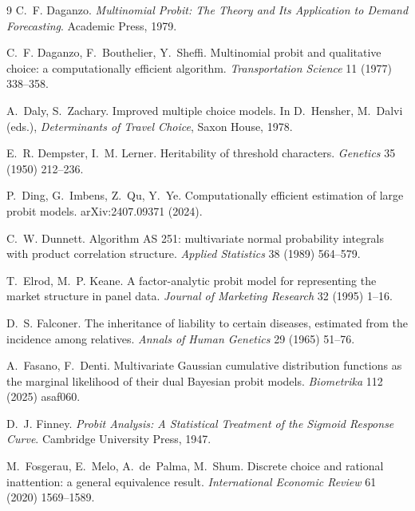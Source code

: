 \documentclass[12pt]{article}
\theoremstyle{remark}
\begin{document}
\begin{thebibliography}{9}
 C.~F. Daganzo. \emph{Multinomial
Probit: The Theory and Its Application to Demand Forecasting}. Academic
Press, 1979.

 C.~F. Daganzo, F.~Bouthelier, Y.~Sheffi.
Multinomial probit and qualitative choice: a computationally efficient
algorithm. \emph{Transportation Science} 11 (1977) 338--358.

 A.~Daly, S.~Zachary.
Improved multiple choice models. In D.~Hensher, M.~Dalvi (eds.),
\emph{Determinants of Travel Choice}, Saxon House, 1978.

 E.~R. Dempster,
I.~M. Lerner. Heritability of threshold characters. \emph{Genetics} 35
(1950) 212--236.

 P.~Ding,
G.~Imbens, Z.~Qu, Y.~Ye. Computationally efficient estimation of large
probit models. arXiv:2407.09371 (2024).

 C.~W. Dunnett. Algorithm AS 251:
multivariate normal probability integrals with product correlation
structure. \emph{Applied Statistics} 38 (1989) 564--579.

 T.~Elrod, M.~P. Keane. A factor-analytic probit model for
representing the market structure in panel data. \emph{Journal of Marketing
Research} 32 (1995) 1--16.

 D.~S. Falconer. The inheritance
of liability to certain diseases, estimated from the incidence among
relatives. \emph{Annals of Human Genetics} 29 (1965) 51--76.

 A.~Fasano, F.~Denti. Multivariate Gaussian
cumulative distribution functions as the marginal likelihood of their
dual Bayesian probit models. \emph{Biometrika} 112 (2025) asaf060.

 D.~J. Finney. \emph{Probit
Analysis: A Statistical Treatment of the Sigmoid Response Curve}.
Cambridge University Press, 1947.

 M.~Fosgerau, E.~Melo, A.~de~Palma, M.~Shum. Discrete
choice and rational inattention: a general equivalence result.
\emph{International Economic Review} 61 (2020) 1569--1589.


\end{thebibliography}
\end{document}
